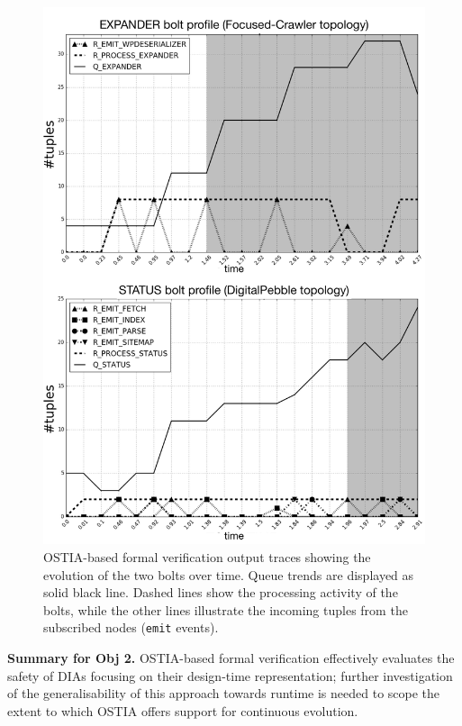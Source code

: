 \documentclass[smallextended]{svjour3}       %
\begin{document}
\begin{figure}
\centering
\includegraphics[width=1\linewidth,draft]{fig11}
\caption{OSTIA-based formal verification output traces showing the evolution of the two bolts over time. Queue trends are displayed as solid black line. Dashed lines show the processing activity of the bolts, while the other lines illustrate the incoming tuples from the subscribed nodes (\texttt{emit} events).}
\label{verif-trace}
\end{figure}


\begin{framed}
\textbf{Summary for Obj 2.} OSTIA-based formal verification effectively evaluates the safety of DIAs focusing on their design-time representation; further investigation of the generalisability of this approach towards runtime is needed to scope the extent to which OSTIA offers support for continuous evolution.
\end{framed}
\end{document}
